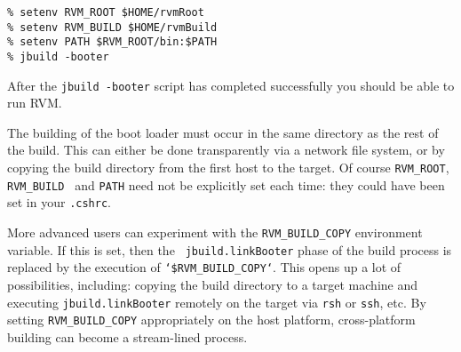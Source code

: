 \begin{verbatim}
% setenv RVM_ROOT $HOME/rvmRoot
% setenv RVM_BUILD $HOME/rvmBuild
% setenv PATH $RVM_ROOT/bin:$PATH
% jbuild -booter
\end{verbatim}

After the {\tt jbuild -booter} script has completed successfully you should be able 
to run RVM. 

The building of the boot loader must occur in the same directory as
the rest of the build.  This can either be done transparently via a
network file system, or by copying the build directory from the first
host to the target.  Of course {\tt RVM\_ROOT}, {\tt RVM\_BUILD }
and {\tt PATH} need not be explicitly set each time: they could have
been set in your {\tt .cshrc}.

More advanced users can experiment with the {\tt RVM\_BUILD\_COPY}
environment variable.  If this is set, then the {\tt
  jbuild.linkBooter} phase of the build process is replaced by the
execution of {\tt `\$RVM\_BUILD\_COPY`}.  This opens up a lot of
possibilities, including: copying the build directory to a target
machine and executing {\tt jbuild.linkBooter} remotely on the target
via {\tt rsh} or {\tt ssh}, etc.  By setting {\tt RVM\_BUILD\_COPY}
appropriately on the host platform, cross-platform building can become
a stream-lined process.









